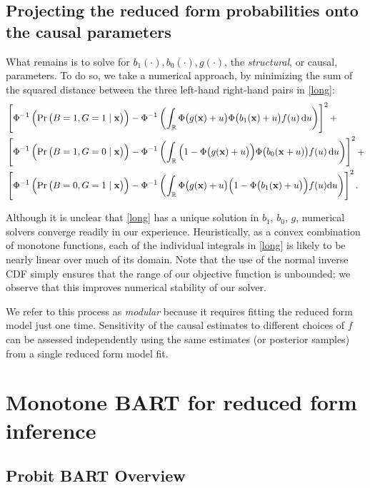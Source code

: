 \documentclass[aoas,preprint, 11pt, dvipsnames, table, x11name]{imsart}
\renewcommand{\bm}[1]{\mathbf{#1}}
\theoremstyle{remark}
\begin{document}
	\subsection{Projecting the reduced form probabilities onto the causal parameters}
	
	What remains is to solve for $b_1(\cdot),b_0(\cdot), g(\cdot)$, the {\em structural}, or causal, parameters. To do so, we take a numerical approach, by minimizing  the sum of the squared distance between the three left-hand right-hand pairs in \autoref{long}:
	\begin{align*}
		&\left[\Phi^{-1}\left(\Pr\qty(B=1, G=1\mid \mathbf{x})\right)-\Phi^{-1}\left(\int_{\mathbb{R}} \Phi\qty(g(\mathbf{x})+u)\Phi\qty(b_1(\mathbf{x})+u)f(u)\dd{u}\right)\right]^2+\\
		&\left[\Phi^{-1}\left(\Pr\qty(B=1, G=0\mid \mathbf{x})\right)-\Phi^{-1}\left(\int_{\mathbb{R}} \qty(1-\Phi\qty(g(\bm{x})+u))\Phi\qty(b_0(\bm{x}+u))f(u)\dd{u}\right)\right]^2+\\
		&\left[\Phi^{-1}\left(\Pr\qty(B=0, G=1\mid \mathbf{x})\right)-\Phi^{-1}\left(\int_{\mathbb{R}}\Phi\qty(g(\bm{x})+u)\qty(1-\Phi\qty(b_1(\bm{x})+u))f(u)\dd u\right)\right]^2.
	\end{align*}
	
	Although it is unclear that \autoref{long} has a unique solution in $b_1$, $b_0$, $g$, numerical solvers converge readily in our experience. Heuristically, as a convex combination of monotone functions, each of the individual integrals in \autoref{long} is likely to be nearly linear over much of its domain. Note that the use of the normal inverse CDF simply ensures that the range of our objective function is unbounded; we observe that this improves numerical stability of our solver.
	
	We refer to this process as {\em modular} because it requires fitting the reduced form model just one time. Sensitivity of the causal estimates to different choices of $f$ can be assessed independently using the same estimates (or posterior samples) from a single reduced form model fit.
	
	\section{Monotone BART for reduced form inference}
	
	\subsection{Probit BART Overview}
	
\end{document}
